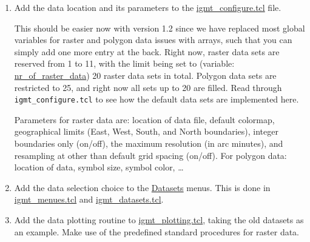 \documentclass[11pt]{article}
\begin{document}
\begin{enumerate}

\item Add the data location and its parameters to the 
  \url{igmt_configure.tcl} file. 
  
  This should be easier now with version 1.2 since we have replaced
  most global variables for raster and polygon data issues with
  arrays, such that you can simply add one more entry at the back.
  Right now, raster data sets are reserved from 1 to 11, with the
  limit being set to (variable: \url{nr_of_raster_data}) 20 raster
  data sets in total. Polygon data sets are restricted to 25, and
  right now all sets up to 20 are filled.  Read through {\tt
    igmt\_configure.tcl} to see how the default data sets are
  implemented here.

  Parameters for raster data are: location of data file, default
  colormap, geographical limits (East, West, South, and North
  boundaries), integer boundaries only (on/off),  the maximum
  resolution (in arc minutes), and resampling at other than default
  grid spacing (on/off). For polygon data: location of data, symbol size, symbol
  color, \ldots

\item Add the data selection choice to the \url{Datasets} menus. This
  is done in \url{igmt_menues.tcl} and \url{igmt_datasets.tcl}.

\item Add the data plotting routine to \url{igmt_plotting.tcl},
  taking the old datasets as an example. Make use of the predefined
  standard procedures for raster data.

\end{enumerate}
\end{document}
